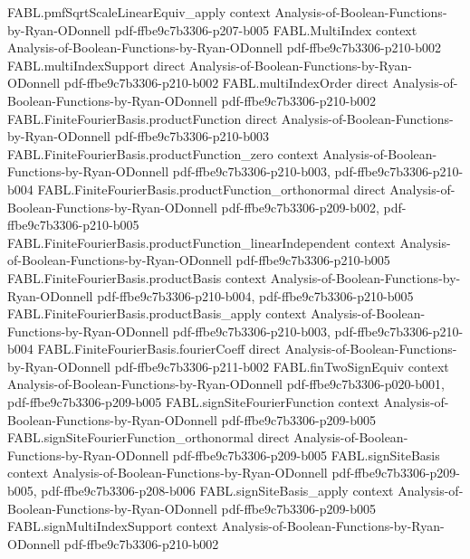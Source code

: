\begin{theorem}
\proofstep
  {FABL.pmfSqrtScaleLinearEquiv_apply}
  {context}
  {Analysis-of-Boolean-Functions-by-Ryan-ODonnell}
  {pdf-ffbe9c7b3306-p207-b005}
\proofstep
  {FABL.MultiIndex}
  {context}
  {Analysis-of-Boolean-Functions-by-Ryan-ODonnell}
  {pdf-ffbe9c7b3306-p210-b002}
\proofstep
  {FABL.multiIndexSupport}
  {direct}
  {Analysis-of-Boolean-Functions-by-Ryan-ODonnell}
  {pdf-ffbe9c7b3306-p210-b002}
\proofstep
  {FABL.multiIndexOrder}
  {direct}
  {Analysis-of-Boolean-Functions-by-Ryan-ODonnell}
  {pdf-ffbe9c7b3306-p210-b002}
\proofstep
  {FABL.FiniteFourierBasis.productFunction}
  {direct}
  {Analysis-of-Boolean-Functions-by-Ryan-ODonnell}
  {pdf-ffbe9c7b3306-p210-b003}
\proofstep
  {FABL.FiniteFourierBasis.productFunction_zero}
  {context}
  {Analysis-of-Boolean-Functions-by-Ryan-ODonnell}
  {pdf-ffbe9c7b3306-p210-b003,
    pdf-ffbe9c7b3306-p210-b004}
\proofstep
  {FABL.FiniteFourierBasis.productFunction_orthonormal}
  {direct}
  {Analysis-of-Boolean-Functions-by-Ryan-ODonnell}
  {pdf-ffbe9c7b3306-p209-b002,
    pdf-ffbe9c7b3306-p210-b005}
\proofstep
  {FABL.FiniteFourierBasis.productFunction_linearIndependent}
  {context}
  {Analysis-of-Boolean-Functions-by-Ryan-ODonnell}
  {pdf-ffbe9c7b3306-p210-b005}
\proofstep
  {FABL.FiniteFourierBasis.productBasis}
  {context}
  {Analysis-of-Boolean-Functions-by-Ryan-ODonnell}
  {pdf-ffbe9c7b3306-p210-b004,
    pdf-ffbe9c7b3306-p210-b005}
\proofstep
  {FABL.FiniteFourierBasis.productBasis_apply}
  {context}
  {Analysis-of-Boolean-Functions-by-Ryan-ODonnell}
  {pdf-ffbe9c7b3306-p210-b003,
    pdf-ffbe9c7b3306-p210-b004}
\proofstep
  {FABL.FiniteFourierBasis.fourierCoeff}
  {direct}
  {Analysis-of-Boolean-Functions-by-Ryan-ODonnell}
  {pdf-ffbe9c7b3306-p211-b002}
\proofstep
  {FABL.finTwoSignEquiv}
  {context}
  {Analysis-of-Boolean-Functions-by-Ryan-ODonnell}
  {pdf-ffbe9c7b3306-p020-b001,
    pdf-ffbe9c7b3306-p209-b005}
\proofstep
  {FABL.signSiteFourierFunction}
  {context}
  {Analysis-of-Boolean-Functions-by-Ryan-ODonnell}
  {pdf-ffbe9c7b3306-p209-b005}
\proofstep
  {FABL.signSiteFourierFunction_orthonormal}
  {direct}
  {Analysis-of-Boolean-Functions-by-Ryan-ODonnell}
  {pdf-ffbe9c7b3306-p209-b005}
\proofstep
  {FABL.signSiteBasis}
  {context}
  {Analysis-of-Boolean-Functions-by-Ryan-ODonnell}
  {pdf-ffbe9c7b3306-p209-b005,
    pdf-ffbe9c7b3306-p208-b006}
\proofstep
  {FABL.signSiteBasis_apply}
  {context}
  {Analysis-of-Boolean-Functions-by-Ryan-ODonnell}
  {pdf-ffbe9c7b3306-p209-b005}
\proofstep
  {FABL.signMultiIndexSupport}
  {context}
  {Analysis-of-Boolean-Functions-by-Ryan-ODonnell}
  {pdf-ffbe9c7b3306-p210-b002}

\end{theorem}
